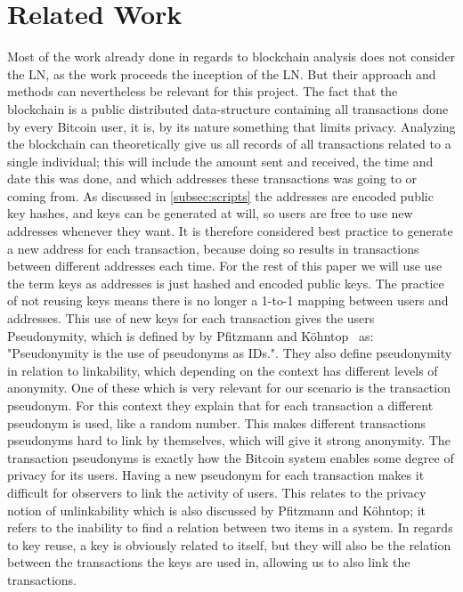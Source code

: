 
\section{Related Work}
\label{sec:related}

Most of the work already done in regards to blockchain analysis does not consider the LN, as the work proceeds the inception of the LN. But their approach and methods can nevertheless be relevant for this project.
The fact that the blockchain is a public distributed data-structure containing all transactions done by every Bitcoin user, it is, by its nature something that limits privacy. Analyzing the blockchain can theoretically give us all records of all transactions related to a single individual; this will include the amount sent and received, the time and date this was done, and which addresses these transactions was going to or coming from. As discussed in \cref{subsec:scripts} the addresses are encoded public key hashes, and keys can be generated at will, so users are free to use new addresses whenever they want. It is therefore considered best practice to generate a new address for each transaction, because doing so results in transactions between different addresses each time. For the rest of this paper we will use use the term keys as addresses is just hashed and encoded public keys. 
The practice of not reusing keys means there is no longer a 1-to-1 mapping between users and addresses.
This use of new keys for each transaction gives the users Pseudonymity, which is defined by by Pfitzmann and Köhntop~\cite{pfitzmann2001anonymity} as: "Pseudonymity is the use of pseudonyms as IDs.". They also define pseudonymity in relation to linkability, which depending on the context has different levels of anonymity. One of these which is very relevant for our scenario is the transaction pseudonym. For this context they explain that for each transaction a different pseudonym is used, like a random number. This makes different transactions pseudonyms hard to link by themselves, which will give it strong anonymity. The transaction pseudonyms is exactly how the Bitcoin system enables some degree of privacy for its users. Having a new pseudonym for each transaction makes it difficult for observers to link the activity of users. This relates to the privacy notion of unlinkability which is also discussed by Pfitzmann and Köhntop; it refers to the inability to find a relation between two items in a system. 
In regards to key reuse, a key is obviously related to itself, but they will also be the relation between the transactions the keys are used in, allowing us to also link the transactions.
